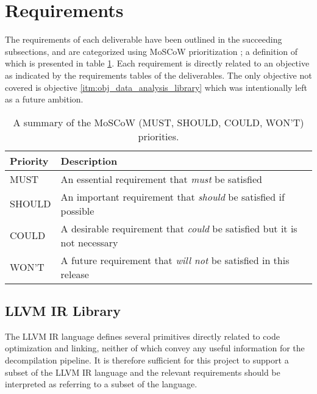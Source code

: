 

\section{Requirements}
\label{sec:requirements}

The requirements of each deliverable have been outlined in the succeeding subsections, and are categorized using MoSCoW prioritization \cite{MoSCoW_analysis}; a definition of which is presented in table \ref{tbl:MoSCoW_priorities}. Each requirement is directly related to an objective as indicated by the requirements tables of the deliverables. The only objective not covered is objective \ref{itm:obj_data_analysis_library} which was intentionally left as a future ambition.

\begin{table}[htbp]
	\begin{center}
		\begin{tabular}{|l|l|}
			\hline
			Priority & Description \\
			\hline
			MUST & An essential requirement that \textit{must} be satisfied \\
			SHOULD & An important requirement that \textit{should} be satisfied if possible \\
			COULD & A desirable requirement that \textit{could} be satisfied but it is not necessary \\
			WON'T & A future requirement that \textit{will not} be satisfied in this release \\
			\hline
		\end{tabular}
	\end{center}
	\caption{A summary of the MoSCoW (MUST, SHOULD, COULD, WON'T) priorities.}
	\label{tbl:MoSCoW_priorities}
\end{table}


\subsection{LLVM IR Library}

The LLVM IR language defines several primitives directly related to code optimization and linking, neither of which convey any useful information for the decompilation pipeline. It is therefore sufficient for this project to support a subset of the LLVM IR language and the relevant requirements should be interpreted as referring to a subset of the language.

